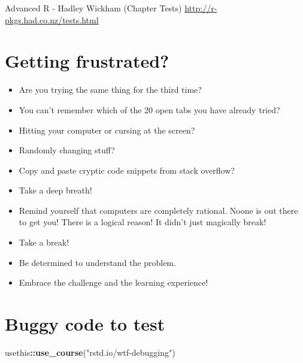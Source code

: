 \documentclass[]{book}
\newenvironment{Shaded}{\begin{snugshade}}{\end{snugshade}}
\newcommand{\KeywordTok}[1]{\textcolor[rgb]{0.13,0.29,0.53}{\textbf{#1}}}
\newcommand{\NormalTok}[1]{#1}
\newcommand{\OperatorTok}[1]{\textcolor[rgb]{0.81,0.36,0.00}{\textbf{#1}}}
\newcommand{\StringTok}[1]{\textcolor[rgb]{0.31,0.60,0.02}{#1}}
\begin{document}
Advanced R - Hadley Wickham (Chapter Tests)
\url{http://r-pkgs.had.co.nz/tests.html}

\hypertarget{getting-frustrated}{%
\chapter{Getting frustrated?}\label{getting-frustrated}}

\begin{itemize}
\item
  Are you trying the same thing for the third time?
\item
  You can't remember which of the 20 open tabs you have already tried?
\item
  Hitting your computer or cursing at the screen?
\item
  Randomly changing stuff?
\item
  Copy and paste cryptic code snippets from stack overflow?
\item
  Take a deep breath!
\item
  Remind yourself that computers are completely rational.
  Noone is out there to get you! There is a logical reason!
  It didn't just magically break!
\item
  Take a break!
\item
  Be determined to understand the problem.
\item
  Embrace the challenge and the learning experience!
\end{itemize}

\hypertarget{buggy-code-to-test}{%
\chapter{Buggy code to test}\label{buggy-code-to-test}}

\begin{Shaded}
\begin{Highlighting}[]
\NormalTok{usethis}\OperatorTok{::}\KeywordTok{use_course}\NormalTok{(}\StringTok{"rstd.io/wtf-debugging"}\NormalTok{)}
\end{Highlighting}
\end{Shaded}


\end{document}
